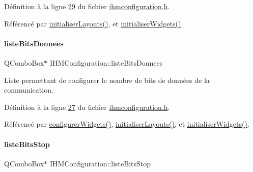 Définition à la ligne \hyperlink{ihmconfiguration_8h_source_l00029}{29} du fichier \hyperlink{ihmconfiguration_8h_source}{ihmconfiguration.\+h}.



Référencé par \hyperlink{ihmconfiguration_8cpp_source_l00051}{initialiser\+Layouts()}, et \hyperlink{ihmconfiguration_8cpp_source_l00023}{initialiser\+Widgets()}.

\mbox{\label{class_i_h_m_configuration_a83c61d075d53758bd753aada9a0bb452}} 
\paragraph{\texorpdfstring{liste\+Bits\+Donnees}{listeBitsDonnees}}
{\footnotesize\ttfamily Q\+Combo\+Box$\ast$ I\+H\+M\+Configuration\+::liste\+Bits\+Donnees\hspace{0.3cm}{\ttfamily [private]}}



Liste permettant de configurer le nombre de bits de données de la communication. 



Définition à la ligne \hyperlink{ihmconfiguration_8h_source_l00027}{27} du fichier \hyperlink{ihmconfiguration_8h_source}{ihmconfiguration.\+h}.



Référencé par \hyperlink{ihmconfiguration_8cpp_source_l00033}{configurer\+Widgets()}, \hyperlink{ihmconfiguration_8cpp_source_l00051}{initialiser\+Layouts()}, et \hyperlink{ihmconfiguration_8cpp_source_l00023}{initialiser\+Widgets()}.

\mbox{\label{class_i_h_m_configuration_a16ae724388b797983c78e87e7d5485cb}} 
\paragraph{\texorpdfstring{liste\+Bits\+Stop}{listeBitsStop}}
{\footnotesize\ttfamily Q\+Combo\+Box$\ast$ I\+H\+M\+Configuration\+::liste\+Bits\+Stop\hspace{0.3cm}{\ttfamily [private]}}



